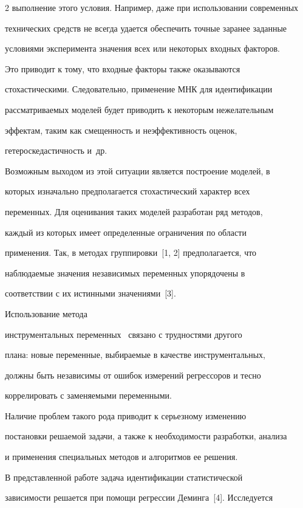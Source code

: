 \begin{multicols}{2}
выполнение этого условия. Например, даже при использовании современных

технических средств не всегда удается обеспечить точные заранее заданные

условиями эксперимента значения всех или некоторых входных факторов.

Это приводит к тому, что входные факторы также оказываются

стохастическими. Следовательно, применение МНК для идентификации

рассматриваемых моделей будет приводить к некоторым нежелательным

эффектам, таким как смещенность и неэффективность оценок,

гетероскедастичность и~др.



  Возможным выходом из этой ситуации является построение моделей, в

которых изначально предполагается стохастический характер всех

переменных. Для оценивания таких моделей разработан ряд методов,

каждый из которых имеет определенные ограничения по области

применения. Так, в методах группировки~[1, 2] предполагается, что

наблюдаемые значения независимых переменных упорядочены в

соответствии с их истинными значениями~[3]. 



Использование метода

инструментальных переменных~\cite{1-tim} связано с трудностями другого

плана: новые переменные, выбираемые в качестве инструментальных,

должны быть независимы от ошибок измерений регрессоров и тесно

коррелировать с заменяемыми переменными.



  Наличие проблем такого рода приводит к серь\-ез\-но\-му изменению

постановки решаемой задачи, а также к необходимости разработки, анализа

и применения специальных методов и алгоритмов ее решения.



  В представленной работе задача идентификации статистической

зависимости решается при помощи регрессии Деминга~[4]. Исследуется


\end{multicols}

